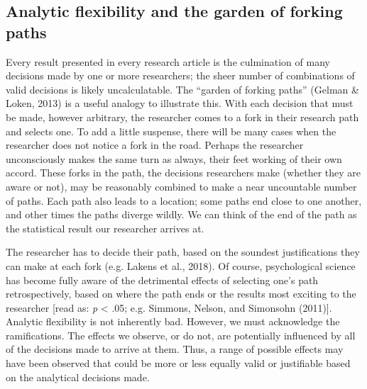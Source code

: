 \documentclass[
  man,floatsintext]{apa6}
\begin{document}
\hypertarget{analytic-flexibility-and-the-garden-of-forking-paths}{%
\subsection{Analytic flexibility and the garden of forking paths}\label{analytic-flexibility-and-the-garden-of-forking-paths}}

Every result presented in every research article is the culmination of many decisions made by one or more researchers; the sheer number of combinations of valid decisions is likely uncalculatable. The ``garden of forking paths'' (Gelman \& Loken, 2013) is a useful analogy to illustrate this. With each decision that must be made, however arbitrary, the researcher comes to a fork in their research path and selects one. To add a little suspense, there will be many cases when the researcher does not notice a fork in the road. Perhaps the researcher unconsciously makes the same turn as always, their feet working of their own accord. These forks in the path, the decisions researchers make (whether they are aware or not), may be reasonably combined to make a near uncountable number of paths. Each path also leads to a location; some paths end close to one another, and other times the paths diverge wildly. We can think of the end of the path as the statistical result our researcher arrives at.

The researcher has to decide their path, based on the soundest justifications they can make at each fork (e.g. Lakens et al., 2018). Of course, psychological science has become fully aware of the detrimental effects of selecting one's path retrospectively, based on where the path ends or the results most exciting to the researcher {[}read as: \emph{p} \textless{} .05; e.g. Simmons, Nelson, and Simonsohn (2011){]}. Analytic flexibility is not inherently bad. However, we must acknowledge the ramifications. The effects we observe, or do not, are potentially influenced by all of the decisions made to arrive at them. Thus, a range of possible effects may have been observed that could be more or less equally valid or justifiable based on the analytical decisions made.
\end{document}
